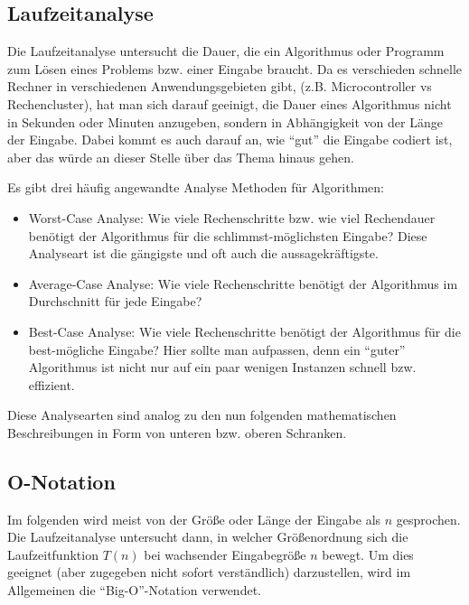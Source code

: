 \documentclass{panikzettel}
\begin{document}
\subsection{Laufzeitanalyse}


Die Laufzeitanalyse untersucht die Dauer, die ein Algorithmus oder Programm zum Lösen eines Problems bzw. einer Eingabe braucht. Da es verschieden schnelle Rechner in verschiedenen Anwendungsgebieten gibt, (z.B. Microcontroller vs Rechencluster), hat man sich darauf geeinigt, die Dauer eines Algorithmus nicht in Sekunden oder Minuten anzugeben, sondern in Abhängigkeit von der Länge der Eingabe. Dabei kommt es auch darauf an, wie ``gut'' die Eingabe codiert ist, aber das würde an dieser Stelle über das Thema hinaus gehen. 

Es gibt drei häufig angewandte Analyse Methoden für Algorithmen:

\begin{itemize}
	\item Worst-Case Analyse: Wie viele Rechenschritte bzw. wie viel Rechendauer benötigt der Algorithmus für die schlimmst-möglichsten Eingabe? Diese Analyseart ist die gängigste und oft auch die aussagekräftigste.
	\item Average-Case Analyse: Wie viele Rechenschritte benötigt der Algorithmus im Durchschnitt für jede Eingabe? 
	\item Best-Case Analyse: Wie viele Rechenschritte benötigt der Algorithmus für die best-mögliche Eingabe? Hier sollte man aufpassen, denn ein ``guter'' Algorithmus ist nicht nur auf ein paar wenigen Instanzen schnell bzw. effizient.
\end{itemize}

Diese Analysearten sind analog zu den nun folgenden mathematischen Beschreibungen in Form von unteren bzw. oberen Schranken.

\subsection{O-Notation}

Im folgenden wird meist von der Größe oder Länge der Eingabe als $n$ gesprochen. Die Laufzeitanalyse untersucht dann, in welcher Größenordnung sich die Laufzeitfunktion $T(n)$ bei wachsender Eingabegröße $n$ bewegt. Um dies geeignet (aber zugegeben nicht sofort verständlich) darzustellen, wird im Allgemeinen die ``Big-O''-Notation verwendet.
\end{document}
